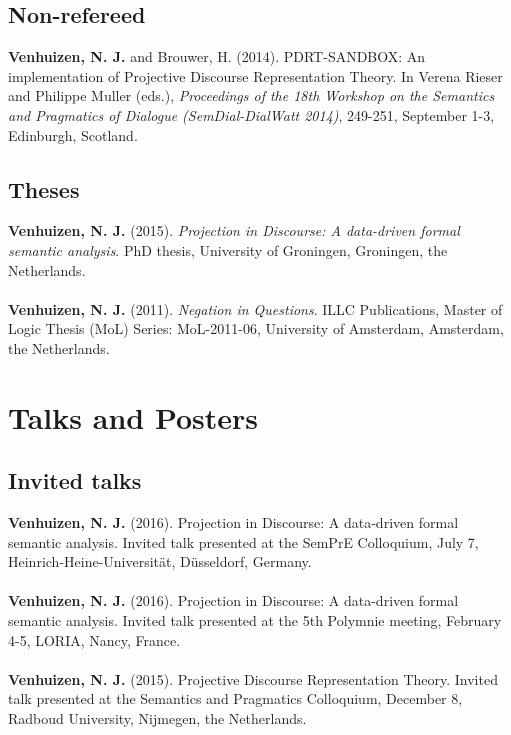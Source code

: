 \documentclass[a4paper,10pt]{article}
\begin{document}
\subsection*{Non-refereed}

\noindent
    \textbf{Venhuizen, N. J.} and Brouwer, H. (2014). PDRT-SANDBOX: An
    implementation of Projective Discourse Representation Theory. In Verena
    Rieser and Philippe Muller (eds.), \textit{Proceedings of the 18th
    Workshop on the Semantics and Pragmatics of Dialogue (SemDial-DialWatt
    2014)}, 249-251, September 1-3, Edinburgh, Scotland.

\subsection*{Theses}

\noindent
    \textbf{Venhuizen, N. J.} (2015). \textit{Projection in Discourse:
      A data-driven formal semantic analysis}. PhD thesis, University of
      Groningen, Groningen, the Netherlands.\\
    \\
    \textbf{Venhuizen, N. J.} (2011). \textit{Negation in Questions}.
      ILLC Publications, Master of Logic Thesis (MoL) Series: MoL-2011-06,
      University of Amsterdam, Amsterdam, the Netherlands.


\section*{Talks and Posters}

    
\subsection*{Invited talks}

\noindent
    \textbf{Venhuizen, N. J.} (2016). Projection in Discourse: A data-driven
    formal semantic analysis. Invited talk presented at the SemPrE Colloquium, 
    July 7, Heinrich-Heine-Universit{\"a}t, D{\"u}sseldorf, Germany.\\
    \\
    \textbf{Venhuizen, N. J.} (2016). Projection in Discourse: A data-driven
    formal semantic analysis. Invited talk presented at the 5th Polymnie
    meeting, February 4-5, LORIA, Nancy, France.\\
    \\
    \textbf{Venhuizen, N. J.} (2015). Projective Discourse Representation
    Theory. Invited talk presented at the Semantics and Pragmatics
    Colloquium, December 8, Radboud University, Nijmegen, the Netherlands.
\end{document}
